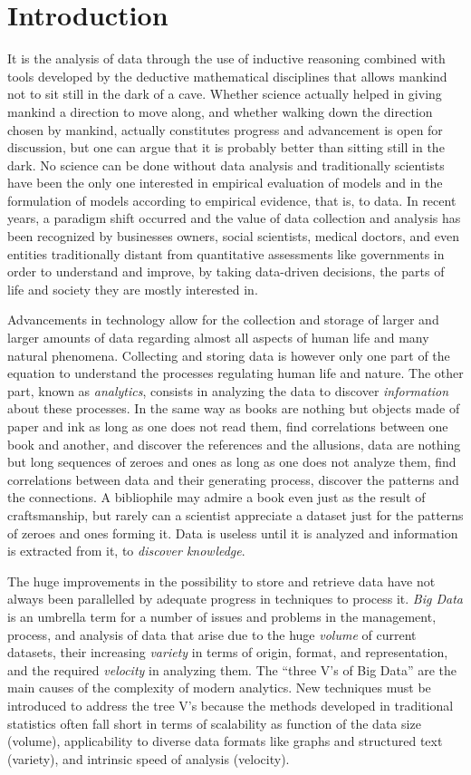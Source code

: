 \chapter{Introduction}\label{ch:intro}
It is the analysis of data through the use of inductive reasoning combined with
tools developed by the deductive mathematical disciplines that allows mankind
not to sit still in the dark of a cave. Whether science actually helped in
giving mankind a direction to move along, and whether walking down the direction
chosen by mankind, actually constitutes progress and advancement is open for
discussion, but one can argue that it is probably better than sitting still
in the dark. No science can be done without data analysis and traditionally
scientists have been the only one interested in empirical evaluation of
models and in the formulation of models according to empirical evidence, that
is, to data. In recent years, a paradigm shift occurred and the value of data
collection and analysis has been recognized by businesses owners, social
scientists, medical doctors, and even entities traditionally distant from
quantitative assessments like governments in order to understand and improve, by
taking data-driven decisions, the parts of life and society they are mostly
interested in.

Advancements in technology allow for the collection and storage of larger and
larger amounts of data regarding almost all aspects of human life and many
natural phenomena. Collecting and storing data is however only one part of the
equation to understand the processes regulating human life and nature. The
other part, known as \emph{analytics}, consists in analyzing the data to
discover \emph{information} about these processes. In the same way as books are
nothing but objects made of paper and ink as long as one does not read them,
find correlations between one book and another, and discover the references and
the allusions, data are nothing but long sequences of zeroes and ones as long as
one does not analyze them, find correlations between data and their generating
process, discover the patterns and the connections. A bibliophile may admire a
book even just as the result of craftsmanship, but rarely can a scientist
appreciate a dataset just for the patterns of zeroes and ones forming it. Data
is useless until it is analyzed and information is extracted from it, to
\emph{discover knowledge}.

The huge improvements in the possibility to store and retrieve data have
not always been parallelled by adequate progress in techniques to process it.
\emph{Big Data} is an umbrella term for a number of issues and problems in the
management, process, and analysis of data that arise due to the huge
\emph{volume} of current datasets, their increasing \emph{variety} in terms of
origin, format, and representation, and the required \emph{velocity} in
analyzing them. The ``three V's of Big Data'' are the main causes of the
complexity of modern analytics. New techniques must be introduced to address the
tree V's because the methods developed in traditional statistics often fall short in
terms of scalability as function of the data size (volume), applicability to
diverse data formats like graphs and structured text (variety), and intrinsic
speed of analysis (velocity).

